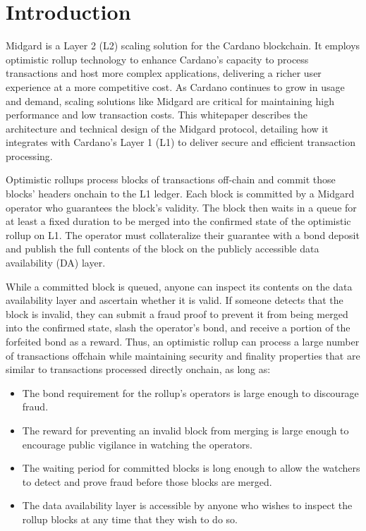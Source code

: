 \documentclass[../midgard.tex]{subfiles}
\begin{document}
\section*{Introduction}
\label{h:introduction}

Midgard is a Layer 2 (L2) scaling solution for the Cardano blockchain.
It employs optimistic rollup technology to enhance Cardano's capacity to process transactions and host more complex applications, delivering a richer user experience at a more competitive cost.
As Cardano continues to grow in usage and demand, scaling solutions like Midgard are critical for maintaining high performance and low transaction costs.
This whitepaper describes the architecture and technical design of the Midgard protocol, detailing how it integrates with Cardano's Layer 1 (L1) to deliver secure and efficient transaction processing.

Optimistic rollups process blocks of transactions off-chain and commit those blocks' headers onchain to the L1 ledger.
Each block is committed by a Midgard operator who guarantees the block's validity.
The block then waits in a queue for at least a fixed duration to be merged into the confirmed state of the optimistic rollup on L1.
The operator must collateralize their guarantee with a bond deposit and publish the full contents of the block on the publicly accessible data availability (DA) layer.

While a committed block is queued, anyone can inspect its contents on the data availability layer and ascertain whether it is valid.
If someone detects that the block is invalid, they can submit a fraud proof to prevent it from being merged into the confirmed state, slash the operator's bond, and receive a portion of the forfeited bond as a reward.
Thus, an optimistic rollup can process a large number of transactions offchain while maintaining security and finality properties that are similar to transactions processed directly onchain, as long as:
\begin{itemize}
    \item The bond requirement for the rollup's operators is large enough to discourage fraud.
    \item The reward for preventing an invalid block from merging is large enough to encourage public vigilance in watching the operators.
    \item The waiting period for committed blocks is long enough to allow the watchers to detect and prove fraud before those blocks are merged.
    \item The data availability layer is accessible by anyone who wishes to inspect the rollup blocks at any time that they wish to do so.
\end{itemize}
\end{document}
